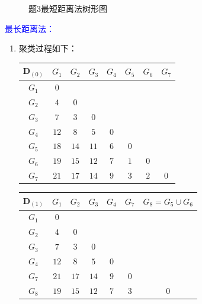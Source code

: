 \begin{enumerate}
\begin{enumerate}[label=(\arabic*)]
\begin{figure}[H]
                \caption{题3最短距离法树形图}
            \end{figure}
        \end{enumerate}
        {\kaishu \textcolor{blue}{最长距离法：}}
        \begin{enumerate}[label=(\arabic*)]
            \item 聚类过程如下：
            \begin{table}[H]
                \centering
                \begin{tabular}{|c|c|c|c|c|c|c|c|}
                    \hline
                    $\pmb{D}_{(0)}$ & $G_1$ & $G_2$ & $G_3$ & $G_4$ & $G_5$ & $G_6$ & $G_7$\\ \hline
                    $G_1$ & $0$ & & & & & & \\ \hline
                    $G_2$ & $4$ & $0$ & & & & & \\ \hline
                    $G_3$ & $7$ & $3$ & $0$ & & & & \\ \hline
                    $G_4$ & $12$ & $8$ & $5$ & $0$ & & & \\ \hline
                    $G_5$ & $18$ & $14$ & $11$ & $6$ & $0$ & & \\ \hline
                    $G_6$ & $19$ & $15$ & $12$ & $7$ & $\textit{1}$ & $0$ & \\ \hline
                    $G_7$ & $21$ & $17$ & $14$ & $9$ & $3$ & $2$ & $0$ \\ \hline
                \end{tabular}
            \end{table}
            \begin{table}[H]
                \centering
                \begin{tabular}{|c|c|c|c|c|c|c|}
                    \hline
                    $\pmb{D}_{(1)}$ & $G_1$ & $G_2$ & $G_3$ & $G_4$ & $G_7$ & $G_8=G_5 \cup G_6$ \\ \hline
                    $G_1$ & $0$ & & & & & \\ \hline
                    $G_2$ & $4$ & $0$ & & & & \\ \hline
                    $G_3$ & $7$ & $3$ & $0$ & & & \\ \hline
                    $G_4$ & $12$ & $8$ & $5$ & $0$ & & \\ \hline
                    $G_7$ & $21$ & $17$ & $14$ & $9$ & $0$ & \\ \hline
                    $G_8$ & $19$ & $15$ & $12$ & $7$ & $\textit{3}$ & $0$ \\ \hline

\end{tabular}
\end{table}
\end{enumerate}
\end{enumerate}
